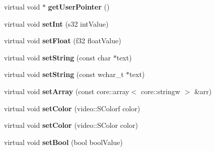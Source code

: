 \begin{DoxyCompactItemize}
\item 
\hypertarget{classirr_1_1io_1_1_i_attribute_a2b90d1cd505026e52abeec4b83b25f58}{virtual void $\ast$ {\bfseries get\-User\-Pointer} ()}\label{classirr_1_1io_1_1_i_attribute_a2b90d1cd505026e52abeec4b83b25f58}

\item 
\hypertarget{classirr_1_1io_1_1_i_attribute_afbfd7098eebee86ea52d019abafe538c}{virtual void {\bfseries set\-Int} (s32 int\-Value)}\label{classirr_1_1io_1_1_i_attribute_afbfd7098eebee86ea52d019abafe538c}

\item 
\hypertarget{classirr_1_1io_1_1_i_attribute_a292f0459ac556cdbef61cb55f0400b20}{virtual void {\bfseries set\-Float} (f32 float\-Value)}\label{classirr_1_1io_1_1_i_attribute_a292f0459ac556cdbef61cb55f0400b20}

\item 
\hypertarget{classirr_1_1io_1_1_i_attribute_aba43ddb151bbea6f3bea9b85969b2027}{virtual void {\bfseries set\-String} (const char $\ast$text)}\label{classirr_1_1io_1_1_i_attribute_aba43ddb151bbea6f3bea9b85969b2027}

\item 
\hypertarget{classirr_1_1io_1_1_i_attribute_a9f95b345b0ea71473c2309862fdb1168}{virtual void {\bfseries set\-String} (const wchar\-\_\-t $\ast$text)}\label{classirr_1_1io_1_1_i_attribute_a9f95b345b0ea71473c2309862fdb1168}

\item 
\hypertarget{classirr_1_1io_1_1_i_attribute_ab8da46ee7853c5b6d2cee8f8482b1d8e}{virtual void {\bfseries set\-Array} (const core\-::array$<$ core\-::stringw $>$ \&arr)}\label{classirr_1_1io_1_1_i_attribute_ab8da46ee7853c5b6d2cee8f8482b1d8e}

\item 
\hypertarget{classirr_1_1io_1_1_i_attribute_a9a6b35bb4d7a98867a8ed29f0f74387c}{virtual void {\bfseries set\-Color} (video\-::\-S\-Colorf color)}\label{classirr_1_1io_1_1_i_attribute_a9a6b35bb4d7a98867a8ed29f0f74387c}

\item 
\hypertarget{classirr_1_1io_1_1_i_attribute_aa9bd1cd539d96efeed647b86b1408151}{virtual void {\bfseries set\-Color} (video\-::\-S\-Color color)}\label{classirr_1_1io_1_1_i_attribute_aa9bd1cd539d96efeed647b86b1408151}

\item 
\hypertarget{classirr_1_1io_1_1_i_attribute_a62845d2dea0aec9579e7d58d8b1658a0}{virtual void {\bfseries set\-Bool} (bool bool\-Value)}\label{classirr_1_1io_1_1_i_attribute_a62845d2dea0aec9579e7d58d8b1658a0}


\end{DoxyCompactItemize}

